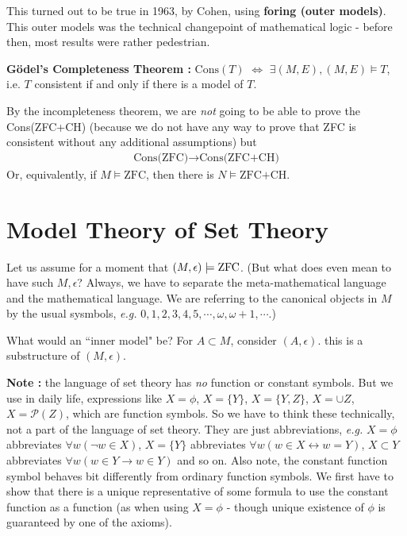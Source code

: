 \documentclass[12pt,a4paper]{article}
\begin{document}
\quad This turned out to be true in 1963, by Cohen, using \textbf{foring (outer models)}. This outer models was the technical changepoint of mathematical logic - before then, most results were rather pedestrian.
\s

\textbf{G\"{o}del's Completeness Theorem :} $\text{Cons}(T)$ $\Leftrightarrow$ $\exists (M,E), (M,E) \models T$, i.e. $T$ consistent if and only if there is a model of $T$.
\s

By the incompleteness theorem, we are \emph{not} going to be able to prove the Cons(ZFC+CH) (because we do not have any way to prove that ZFC is consistent without any additional assumptions) but
\begin{align*}
\text{Cons(ZFC)} \rightarrow \text{Cons(ZFC+CH)}
\end{align*}
Or, equivalently, if $M \models \text{ZFC}$, then there is $N\models \text{ZFC+CH}$.
\s

\section{Model Theory of Set Theory}

Let us assume for a moment that $(M, \epsilon) \models \text{ZFC}$. (But what does even mean to have such $M, \epsilon$? Always, we have to separate the meta-mathematical language and the mathematical language. We are referring to the canonical objects in $M$ by the usual sysmbols, \textit{e.g.} $0,1,2,3,4,5,\cdots, \omega, \omega+1, \cdots$.)

\quad What would an ``inner model" be? For $A\subset M$, consider $(A, \epsilon)$. this is a substructure of $(M, \epsilon)$.
\s

\textbf{Note :} the language of set theory has \emph{no} function or constant symbols. But we use in daily life, expressions like $X= \phi$, $X= \{Y\}$, $X= \{Y, Z\}$, $X= \cup Z$, $X= \mathscr{P}(Z)$, which are function symbols. So we have to think these technically, not a part of the language of set theory. They are just abbreviations, \textit{e.g.} $X= \phi$ abbreviates $\forall w(\neg w\in X)$, $X =\{ Y\}$ abbreviates $\forall w(w\in X \leftrightarrow w=Y)$, $X\subset Y$ abbreviates $\forall w(w\in Y \rightarrow w\in Y)$ and so on. Also note, the constant function symbol behaves bit differently from ordinary function symbols. We first have to show that there is a unique representative of some formula to use the constant function as a function (as when using $X= \phi$ - though unique existence of $\phi$ is guaranteed by one of the axioms).
\s
\end{document}
